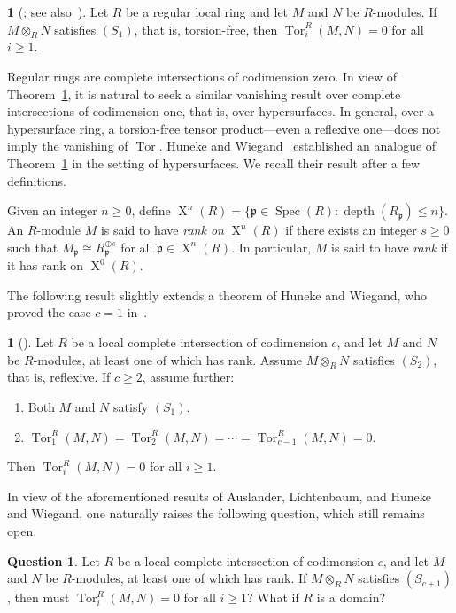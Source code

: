 \documentclass[11pt]{amsart}
\theoremstyle{definition}
\theoremstyle{definition}
\newtheorem{ques}[thm]{Question}
\newtheorem{chunk}[thm]{\hspace*{-1.065ex}\bf}
\numberwithin{equation}{section}
\newcommand{\fp}{\mathfrak{p}}
\DeclareMathOperator{\X}{X}
\DeclareMathOperator{\depth}{depth}
\DeclareMathOperator{\Spec}{Spec}
\DeclareMathOperator{\Tor}{Tor}
\begin{document}
\begin{chunk} [{\cite[3.1]{Au}; see also~\cite[Cor. 2]{Li}}] \label{AuLi} Let $R$ be a regular local ring and let $M$ and $N$ be $R$-modules. If $M\otimes_RN$ satisfies $(S_1)$, that is, torsion-free, then $\Tor_i^R(M,N)=0$ for all $i\geq 1$.
\end{chunk}

Regular rings are complete intersections of codimension zero. In view of Theorem~\ref{AuLi}, it is natural to seek a similar vanishing result over complete intersections of codimension one, that is, over hypersurfaces. In general, over a hypersurface ring, a torsion-free tensor product---even a reflexive one---does not imply the vanishing of $\Tor$. Huneke and Wiegand~\cite{HW1} established an analogue of Theorem~\ref{AuLi} in the setting of hypersurfaces. We recall their result after a few definitions.
 
Given an integer $n \geq 0$, define $\X^{n}(R) = \{ \fp \in \Spec(R) : \depth(R_{\fp}) \leq n \}$. An $R$-module $M$ is said to have \emph{rank on} $\X^n(R)$ if there exists an integer $s \geq 0$ such that $M_{\fp} \cong R_{\fp}^{\oplus s}$ for all $\fp \in \X^n(R)$. In particular, $M$ is said to have \emph{rank} if it has rank on $\X^0(R)$.

The following result slightly extends a theorem of Huneke and Wiegand, who proved the case $c=1$ in~\cite[2.7]{HW1}.

\begin{chunk}[{\cite[4.20]{Ce}}] \label{Ce-HW1} Let $R$ be a local complete intersection of codimension $c$, and let $M$ and $N$ be $R$-modules, at least one of which has rank. Assume $M \otimes_{R} N$ satisfies $(S_2)$, that is, reflexive. If $c \geq 2$, assume further:
\begin{enumerate}[\rm(i)]
\item Both $M$ and $N$ satisfy $(S_1)$.
\item $\Tor^{R}_{1}(M,N) = \Tor^{R}_{2}(M,N) = \cdots = \Tor^{R}_{c-1}(M,N) = 0$.
\end{enumerate}
Then $\Tor^{R}_{i}(M,N) = 0$ for all $i \geq 1$.
\end{chunk}

In view of the aforementioned results of Auslander, Lichtenbaum, and Huneke and Wiegand, one naturally raises the following question, which still remains open.

\begin{ques} \label{que-HWC} Let $R$ be a local complete intersection of codimension $c$, and let $M$ and $N$ be $R$-modules, at least one of which has rank. If $M \otimes_{R} N$ satisfies $(S_{c+1})$, then must $\Tor^{R}_{i}(M,N) = 0$ for all $i \geq 1$? What if $R$ is a domain?
\end{ques} 
\end{document}
